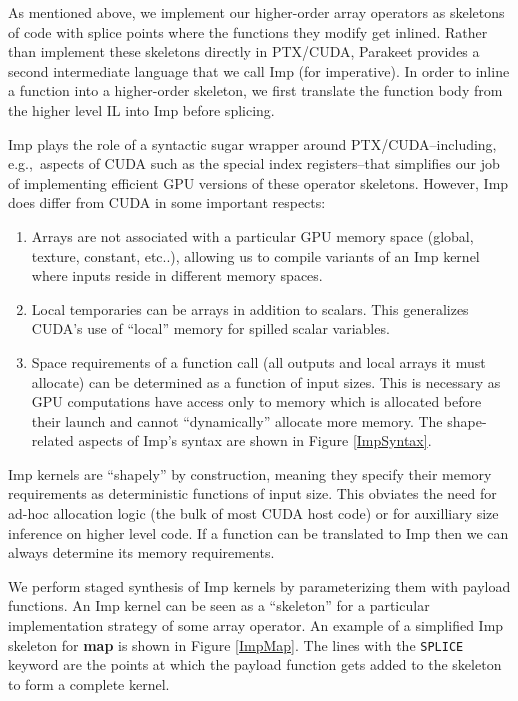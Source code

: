 \documentclass[preprint]{sigplanconf}
\begin{document}
As mentioned above, we implement our higher-order array operators as skeletons
of code with splice points where the functions they modify get inlined.  Rather
than implement these skeletons directly in PTX/CUDA, Parakeet
provides a second intermediate language that we call Imp (for imperative).  In
order to inline a function into a higher-order skeleton, we first translate the
function body from the higher level IL into Imp before splicing.

Imp plays the role of a syntactic sugar wrapper around
PTX/CUDA--including, e.g.,~aspects of CUDA such as the special index
registers--that simplifies our job of implementing efficient GPU versions of
these operator skeletons. However, Imp does differ from CUDA in some important
respects:

\begin{enumerate}
\item  Arrays are not associated with a particular GPU memory space (global,
texture, constant, etc..), allowing us to compile variants of an Imp kernel
where inputs reside in different memory spaces.

\item Local temporaries can be arrays in addition to scalars. This generalizes
CUDA's use of ``local'' memory for spilled scalar variables.

\item Space requirements of a function call (all outputs and local arrays it
must allocate) can be determined as a function of input sizes. This is necessary
as GPU computations have access only to memory which is allocated before their
launch and cannot ``dynamically'' allocate more memory.  The shape-related
aspects of Imp's syntax are shown in Figure \ref{ImpSyntax}.
\end{enumerate}
Imp kernels are ``shapely'' by construction, meaning they specify their memory
requirements as deterministic functions of input size. This obviates the
need for ad-hoc allocation logic (the bulk of most CUDA host code) or for
auxilliary size inference on higher level code. If a function can be translated
to Imp then we can always determine its memory requirements.

We perform staged synthesis of Imp kernels by parameterizing them with payload
functions. An Imp kernel can be seen as a ``skeleton'' \cite{Cole04} for a
particular implementation strategy of some array operator.  An example of a
simplified Imp skeleton for \textbf{map} is shown in Figure \ref{ImpMap}.  The
lines with the \texttt{SPLICE} keyword are the points at which the payload
function gets added to the skeleton to form a complete kernel.
\end{document}
